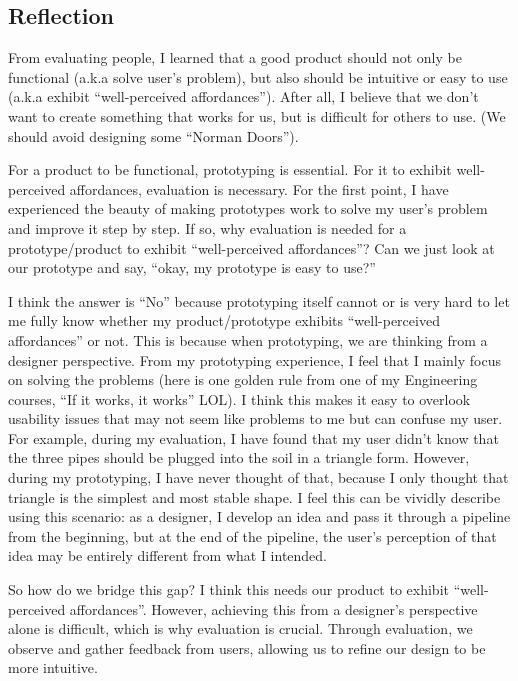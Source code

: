 \documentclass[math,code]{amznotes}
\theoremstyle{remark}
\begin{document}
\subsection{Reflection}
From evaluating people, I learned that a good product should not only be functional (a.k.a solve user's problem), but also should be intuitive or easy to use (a.k.a exhibit ``well-perceived affordances''). After all, I believe  that we don't want to create something that works for us, but is difficult for others to use. (We should avoid designing some ``Norman Doors'').

For a product to be functional, prototyping is essential. For it to exhibit well-perceived affordances, evaluation is necessary.  For the first point, I have experienced the beauty of making prototypes work to solve my user's problem and improve it step by step. If so, why evaluation is needed for a prototype/product to exhibit ``well-perceived affordances''? Can we just look at our prototype and say, ``okay, my prototype is easy to use?''

I think the answer is ``No'' because prototyping itself cannot or is very hard to let me fully know whether my product/prototype exhibits ``well-perceived affordances'' or not. This is because when prototyping, we are thinking from a designer perspective. From my prototyping experience, I feel that I mainly focus on solving the problems (here is one golden rule from one of my Engineering courses, ``If it works, it works'' LOL). I think this makes it easy to overlook usability issues that may not seem like problems to me but can confuse my user. For example, during my evaluation, I have found that my user didn't know that the three pipes should be plugged into the soil in a triangle form. However, during my prototyping, I have never thought of that, because I only thought that triangle is the simplest and most stable shape. I feel this can be vividly describe using this scenario: as a designer, I develop an idea and pass it through a pipeline from the beginning, but at the end of the pipeline, the user’s perception of that idea may be entirely different from what I intended.

So how do we bridge this gap? I think this needs our product to exhibit ``well-perceived affordances''. However, achieving this from a designer’s perspective alone is difficult, which is why evaluation is crucial. Through evaluation, we observe and gather feedback from users, allowing us to refine our design to be more intuitive.
\end{document}
